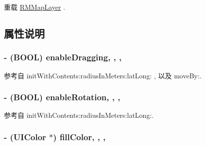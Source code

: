 重载 \hyperlink{interface_r_m_map_layer_ae0e1f8c364aaca4ac39766fe14bbba07}{R\-M\-Map\-Layer} .



\subsection{属性说明}
\hypertarget{interface_r_m_circle_ae3453eee968397a9ec223960f8f3df0f}{
\subsubsection[{enable\-Dragging}]{\setlength{\rightskip}{0pt plus 5cm}-\/ (B\-O\-O\-L) enable\-Dragging\hspace{0.3cm}{\ttfamily [read]}, {\ttfamily [write]}, {\ttfamily [atomic]}, {\ttfamily [assign]}}}\label{interface_r_m_circle_ae3453eee968397a9ec223960f8f3df0f}


参考自 init\-With\-Contents\-:radius\-In\-Meters\-:lat\-Long\-: , 以及 move\-By\-:.

\hypertarget{interface_r_m_circle_ad3138252a9207ccb1639839ddb2c42b8}{
\subsubsection[{enable\-Rotation}]{\setlength{\rightskip}{0pt plus 5cm}-\/ (B\-O\-O\-L) enable\-Rotation\hspace{0.3cm}{\ttfamily [read]}, {\ttfamily [write]}, {\ttfamily [atomic]}, {\ttfamily [assign]}}}\label{interface_r_m_circle_ad3138252a9207ccb1639839ddb2c42b8}


参考自 init\-With\-Contents\-:radius\-In\-Meters\-:lat\-Long\-:.

\hypertarget{interface_r_m_circle_aa00ef131c513cfb8c540d092a733f3fe}{
\subsubsection[{fill\-Color}]{\setlength{\rightskip}{0pt plus 5cm}-\/ (U\-I\-Color $\ast$) fill\-Color\hspace{0.3cm}{\ttfamily [read]}, {\ttfamily [write]}, {\ttfamily [nonatomic]}, {\ttfamily [retain]}}}\label{interface_r_m_circle_aa00ef131c513cfb8c540d092a733f3fe}


